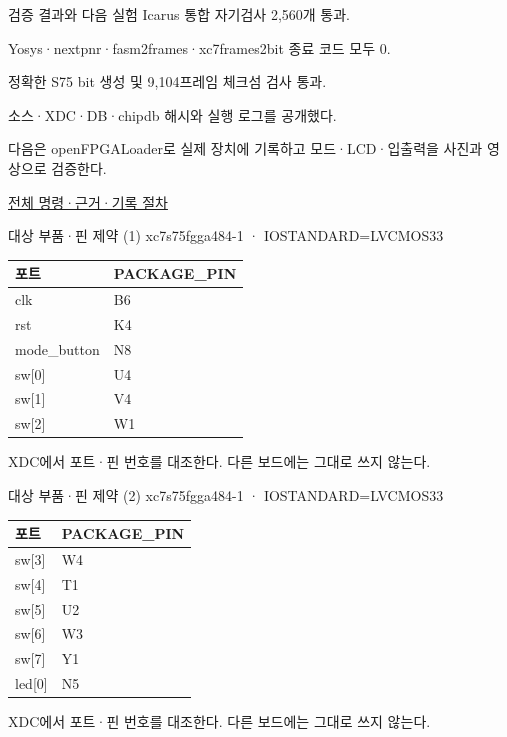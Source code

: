 \begin{frame}{검증 결과와 다음 실험}\relax
\small
Icarus 통합 자기검사 2,560개 통과.\par\vspace{0.22cm}Yosys·nextpnr·fasm2frames·xc7frames2bit 종료 코드 모두 0.\par\vspace{0.22cm}정확한 S75 bit 생성 및 9,104프레임 체크섬 검사 통과.\par\vspace{0.22cm}소스·XDC·DB·chipdb 해시와 실행 로그를 공개했다.\par\vspace{0.22cm}다음은 openFPGALoader로 실제 장치에 기록하고 모드·LCD·입출력을 사진과 영상으로 검증한다.\par\href{https://github.com/Glaysia/ece2_26_2_2/blob/daily/0910/example/fpga_projects_hdl/LAB1/docs/cli.md}{전체 명령·근거·기록 절차}
\end{frame}

\begin{frame}{대상 부품·핀 제약 (1)}\relax
\small
xc7s75fgga484-1 · IOSTANDARD=LVCMOS33\par\begin{center}\renewcommand{\arraystretch}{1.45}
\begin{tabular}{l|l}
포트 & PACKAGE\_PIN\\\hline
clk & B6\\
rst & K4\\
mode\_button & N8\\
sw[0] & U4\\
sw[1] & V4\\
sw[2] & W1\\
\end{tabular}\end{center}
XDC에서 포트·핀 번호를 대조한다. 다른 보드에는 그대로 쓰지 않는다.\par
\end{frame}

\begin{frame}{대상 부품·핀 제약 (2)}\relax
\small
xc7s75fgga484-1 · IOSTANDARD=LVCMOS33\par\begin{center}\renewcommand{\arraystretch}{1.45}
\begin{tabular}{l|l}
포트 & PACKAGE\_PIN\\\hline
sw[3] & W4\\
sw[4] & T1\\
sw[5] & U2\\
sw[6] & W3\\
sw[7] & Y1\\
led[0] & N5\\
\end{tabular}\end{center}
XDC에서 포트·핀 번호를 대조한다. 다른 보드에는 그대로 쓰지 않는다.\par
\end{frame}

